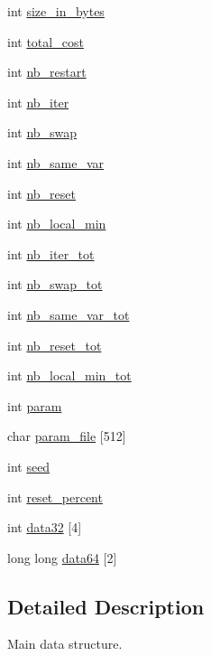 \begin{DoxyCompactItemize}
int \hyperlink{classAdData_a604888715fe344ae4a3331de9283a021}{size\-\_\-in\-\_\-bytes}
\item 
int \hyperlink{classAdData_aac016a9f725d10bdcc414d089a493b6e}{total\-\_\-cost}
\item 
int \hyperlink{classAdData_a1b4d75a8af404b120559b52ac2a387b9}{nb\-\_\-restart}
\item 
int \hyperlink{classAdData_a45ba53841157b7dbf71efd8b39e2da1c}{nb\-\_\-iter}
\item 
int \hyperlink{classAdData_afb68c8b81015411d7cf17bf94328b139}{nb\-\_\-swap}
\item 
int \hyperlink{classAdData_a3f98aa5205fb59c2f8ac70be9626c57c}{nb\-\_\-same\-\_\-var}
\item 
int \hyperlink{classAdData_a1c64449d7cdeee22d68aa719d3249908}{nb\-\_\-reset}
\item 
int \hyperlink{classAdData_a1f285bdad8c77fd7d030456571eb413b}{nb\-\_\-local\-\_\-min}
\item 
int \hyperlink{classAdData_a8912ef6d4f9041a6ccf8a5e2f2ca8789}{nb\-\_\-iter\-\_\-tot}
\item 
int \hyperlink{classAdData_a364283936f3917339829cbd86922699c}{nb\-\_\-swap\-\_\-tot}
\item 
int \hyperlink{classAdData_a79a1aef4b701433f246d5cdc1edc1a0e}{nb\-\_\-same\-\_\-var\-\_\-tot}
\item 
int \hyperlink{classAdData_a55bfd4eb00c611fdc673d09630bba694}{nb\-\_\-reset\-\_\-tot}
\item 
int \hyperlink{classAdData_aee345de54ad3dacf05875ec8a5e64114}{nb\-\_\-local\-\_\-min\-\_\-tot}
\item 
int \hyperlink{classAdData_a99e1f7b94c3bbcca45f638dd5eb92d1c}{param}
\item 
char \hyperlink{classAdData_a465cda10034a2565c78a565db79b1a45}{param\-\_\-file} \mbox{[}512\mbox{]}
\item 
int \hyperlink{classAdData_ad9a435db71511ecf195e7903f16db966}{seed}
\item 
int \hyperlink{classAdData_a8a6886ff5569b524eaacd83bdc963cd1}{reset\-\_\-percent}
\item 
int \hyperlink{classAdData_a165ab98a7a4c0fc157e15ae5a9e42b7e}{data32} \mbox{[}4\mbox{]}
\item 
long long \hyperlink{classAdData_a79473c252c6e58b72813a6843dd1d815}{data64} \mbox{[}2\mbox{]}
\end{DoxyCompactItemize}


\subsection{\-Detailed \-Description}
\-Main data structure. 

